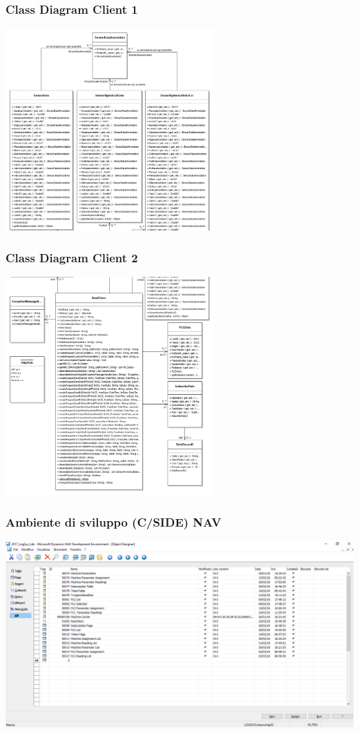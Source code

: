 \documentclass{beamer}
\begin{document}
\begin{frame}
\frametitle{Class Diagram Client 1}
\includegraphics[width=0.6\textwidth]{images/ClassDiagramParte1.png}
\end{frame}

\begin{frame}
\frametitle{Class Diagram Client 2}
\includegraphics[width=0.6\textwidth]{images/ClassDiagramParte2.png}
\end{frame}

\begin{frame}
\frametitle{Ambiente di sviluppo (C/SIDE) NAV}
\includegraphics[width=1\textwidth]{images/NAVDevelopmentEnvironment.png}
\end{frame}
\end{document}
